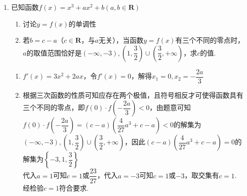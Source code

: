 \begin{enumerate}
\begin{enumerate}
\begin{jieda}
\begin{enumerate}
                
                由图知 $- \dfrac{4}{27} < k \leq  0$ .
            \end{enumerate}
        \end{jieda}
        \item 已知函数$f(x) = x^3+ax^2+b(a, b \in \mathbf{R})$
        \begin{enumerate}
            \item 讨论$y = f(x)$的单调性
            \item 若$b = c-a$（$c \in \mathbf{R}$，与$a$无关），当函数$y = f(x)$有三个不同的零点时，$a$的取值范围恰好是$(-\infty, -3), \left(1, \dfrac{3}{2}\right) \cup \left(\dfrac{3}{2}, +\infty\right)$，求$c$的值.
        \end{enumerate}
        \begin{jieda}
            \begin{enumerate}
                \item $f'(x) = 3x^2+2ax$，令$f'(x) = 0$，解得$x_1 = 0, x_2 = -\dfrac{2a}{3}$
                \item 
                根据三次函数的性质可知应存在两个极值，且符号相反才可使得函数具有三个不同的零点，即$f(0) \cdot f\left(-\dfrac{2a}{3}\right) <0$，由题意可知$f(0) \cdot f\left(-\dfrac{2a}{3}\right) = (c-a)\left(\dfrac{4}{27}a^3+c-a\right) < 0$的解集为$(-\infty, -3), \left(1, \dfrac{3}{2}\right) \cup \left(\dfrac{3}{2}, +\infty\right)$，因此$(c-a)\left(\dfrac{4}{27}a^3+c-a\right) = 0$的解集为$\left\{-3, 1, \dfrac{3}{2}\right\}$ \\
                代入$a = 1$可知$c = 1$或$\dfrac{23}{27}$，代入$a = -3$可知$c = 1$或$-3$，取交集有$c = 1$. \\
                经检验$c = 1$符合要求.
        \end{enumerate}
        \end{jieda}
        

\end{enumerate}
\end{enumerate}
